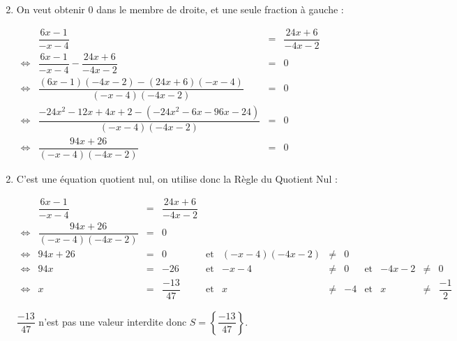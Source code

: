 \documentclass[15pt, mathserif]{beamer}
\begin{document}
 \begin{frame} 
 \begin{enumerate} \setcounter{enumi}{1}  
 	 \item On veut obtenir $0$ dans le membre de droite, et une seule fraction à gauche : 
 
 	 $\begin{array}{crcl} 
 	 	 & \dfrac{6x-1}{-x-4} & = &\dfrac{24x+6}{-4x-2} \\ 
 	 \Leftrightarrow & \dfrac{6x-1}{-x-4}-\dfrac{24x+6}{-4x-2} & = & 0 \\ 
 
 \Leftrightarrow & \dfrac{(6x-1)(-4x-2)-(24x+6)(-x-4)}{(-x-4)(-4x-2)} & = & 0 \\ \Leftrightarrow & \dfrac{-24x^2-12x+4x+2-(-24x^2-6x-96x-24)}{(-x-4)(-4x-2)}& = & 0 \\ \Leftrightarrow & \dfrac{94x+26}{(-x-4)(-4x-2)} & = & 0 
 	 \end{array}$ 
 \end{enumerate} 
 \end{frame} 
 \begin{frame} 
 \begin{enumerate} \setcounter{enumi}{1}  
 	 \item C'est une équation quotient nul, on utilise donc la Règle du Quotient Nul :
 
  \tiny{$\begin{array}{crclcrclcrcl} 
 
 	  & \dfrac{6x-1}{-x-4} & = &\dfrac{24x+6}{-4x-2} & & & & & & & & \\ 
 	 \Leftrightarrow & \dfrac{94x+26}{(-x-4)(-4x-2)} & = & 0 & & & & & & & & \\ 
 	 \Leftrightarrow & 94x+26 & =& 0 & \text{et} & (-x-4)(-4x-2) & \neq & 0 \\ 
 	 \Leftrightarrow & 94x&=&-26& \text{et} & -x-4& \neq & 0 & \text{et} & -4x-2& \neq & 0 \\ 
 	 \Leftrightarrow & x&=&\dfrac{-13}{47} & \text{et} & x &\neq&-4 & \text{et} & x & \neq&\dfrac{-1}{2}
 
 \end{array}$} 
 
 \bigskip 
 
 \normalsize{ $ \dfrac{-13}{47} $ n'est pas une valeur interdite donc $S=\left\{ \dfrac{-13}{47}\right\}$.} 
 
 \end{enumerate} \end{frame}
\end{document}

